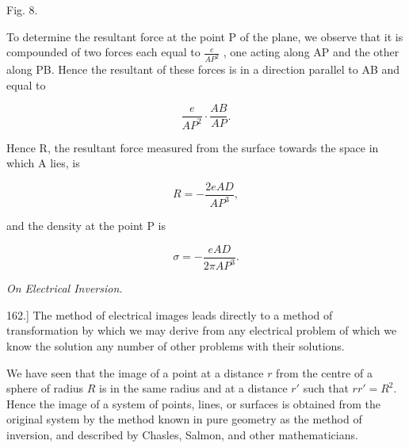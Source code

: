 \documentclass[11pt,a4paper]{article}
\begin{document}
\begin{center}

Fig. 8.
\end{center}

To determine the resultant force at the point P of the plane, we observe that it is compounded of two forces each equal to  $\frac{e}{AP^2}$ , one acting along AP and the other along PB. Hence the resultant of these forces is in a direction parallel to AB and equal to

\[
\frac{e}{AP^2}\cdot\frac{AB}{AP}.
\]

Hence R, the resultant force measured from the surface towards the space in which A lies, is

\begin{equation}\tag{15}
R = -\frac{2eAD}{AP^3},
\end{equation}

and the density at the point P is

\begin{equation}\tag{16}
\sigma = -\frac{eAD}{2\pi AP^3}.
\end{equation}

\begin{center}
\textit{On Electrical Inversion.}
\end{center}

162.] The method of electrical images leads directly to a method of transformation by which we may derive from any electrical problem of which we know the solution any number of other problems with their solutions.

We have seen that the image of a point at a distance $r$ from the
centre of a sphere of radius $R$ is in the same radius and at a
distance $r'$ such that $rr'=R^2$. Hence the image of a system of
points, lines, or surfaces is obtained from the original system by the
method known in pure geometry as the method of inversion, and described
by Chasles, Salmon, and other mathematicians.
\end{document}
